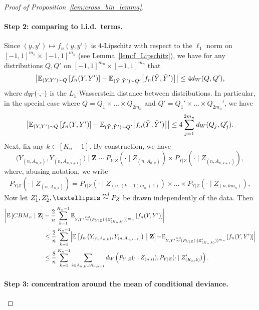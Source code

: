 \documentclass[12pt]{article}
\newcommand{\EEst}[2]{\mathbb{E}\left[{#1}\  \middle| \ {#2}\right]}
\newcommand{\Ep}[2]{\mathbb{E}_{{#1}}\left[{#2}\right]}
\newcommand{\iidsim}{\stackrel{\textnormal{iid}}{\sim}}
\newcommand{\bZ}{\mathbf{Z}}
\begin{document}
\begin{proof}[Proof of Proposition~\ref{lem:cross_bin_lemma}]
\paragraph{Step 2: comparing to i.i.d.\ terms.}
Since $(y,y')\mapsto f_n(y,y')$ is $4$-Lipschitz with respect to the $\ell_1$ norm on $[-1,1]^{m_n} \times [-1,1]^{m_n}$ (see Lemma~\ref{lem:f_Lipschitz}), we have for any distributions $Q,Q'$ on $[-1,1]^{m_n}\times [-1,1]^{m_n}$ that
\[
\bigl|\Ep{(Y,Y')\sim Q}{f_{n}(Y,Y')}
- \mathbb{E}_{(\tilde{Y},\tilde{Y}')\sim Q'}\bigl[f_{n}(\tilde{Y},\tilde{Y}')\bigr]\bigr|\leq 4{\rm d}_{\rm W}(Q,Q'),
\]
where ${\rm d}_{\rm W}(\cdot,\cdot)$ is the $L_1$-Wasserstein distance between distributions.
In particular, in the special case where $Q=Q_1\times\dots\times Q_{2m_n}$ and $Q'=Q_1'\times \dots \times  Q_{2m_n}'$, we have
\[
\bigl|\Ep{(Y,Y')\sim Q}{f_{n}(Y,Y')}
- \mathbb{E}_{(\tilde{Y},\tilde{Y}')\sim Q'}\bigl[f_{n}(\tilde{Y},\tilde{Y}')\bigr]\bigr|\leq 4\sum_{j=1}^{2m_n} {\rm d}_{\rm W}(Q_j,Q'_j).
\]
Next, fix any $k\in [K_n-1]$. By construction, we have
\[
\big( Y_{(n,A_{n,k})}, Y_{(n,A_{n,k+1})}\big) \mid \bZ \sim P_{Y|Z}(\cdot\mid Z_{(n,A_{n,k})})\times P_{Y|Z}(\cdot\mid Z_{(n,A_{n,k+1})}),
\]
where, abusing notation, we write 
\[
P_{Y|Z}(\cdot\mid Z_{(n,A_{n,k})}) = P_{Y|Z}(\cdot\mid Z_{(n,(k-1)m_n+1)}) \times \dots \times P_{Y|Z}(\cdot\mid Z_{(n,km_n)}),
\]
Now let $Z'_1,Z'_2,\dots\iidsim P_Z$ be drawn independently of the data. Then
\begin{align*}
    \biggl|\EEst{{\rm CBM}_n}{\bZ} &- \frac{2}{n} \sum_{k=1}^{K_n-1}\Ep{Y,Y'\iidsim (P_{Y|Z}(\cdot\mid Z'_{(K_n,k)}))^{m_n}}{f_n(Y,Y')}\biggr|\\
    &\leq  \frac{2}{n} \sum_{k=1}^{K_n-1}\Bigl|\EEst{f_n\left(Y_{(n,A_{n,k})}, Y_{(n,A_{n,k+1})}\right)}{\bZ}
    \!-\!  \Ep{Y,Y'\iidsim (P_{Y|Z}(\cdot\mid Z'_{(K_n,k)}))^{m_n}}{f_n(Y,Y')}\Bigr| \\
    &\leq \frac{8}{n}\sum_{k=1}^{K_n-1}
    \sum_{i\in A_{n,k}\cup A_{n,k+1}}{\rm d}_{\rm W}\left(P_{Y|Z}(\cdot\mid Z_{(n,i)}),P_{Y|Z}(\cdot\mid Z'_{(K_n,k)})\right).
\end{align*}

\paragraph{Step 3: concentration around the mean of conditional deviance.}


\end{proof}
\end{document}
